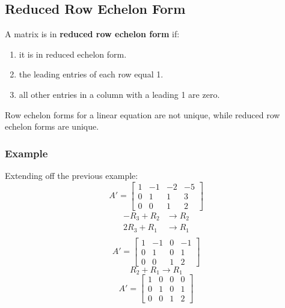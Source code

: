 \documentclass{math}
\begin{document}
\subsection*{Reduced Row Echelon Form}
A matrix is in \textbf{reduced row echelon form} if:
\begin{enumerate}
  \item it is in reduced echelon form.
  \item the leading entries of each row equal 1.
  \item all other entries in a column with a leading 1 are zero.
\end{enumerate}
Row echelon forms for a linear equation are not unique, while reduced row
echelon forms are unique.

\subsubsection*{Example}
Extending off the previous example:
\[ A' = \left[\begin{array}{ccc|c}
  1 & -1 & -2 & -5 \\
  0 & 1 & 1 & 3 \\
  0 & 0 & 1 & 2
\end{array}\right] \]
\begin{align*}
  -R_3+R_2 &\to R_2 \\
  2R_3+R_1 &\to R_1 \\
\end{align*}
\[ A' = \left[\begin{array}{ccc|c}
  1 & -1 & 0 & -1 \\
  0 & 1 & 0 & 1 \\
  0 & 0 & 1 & 2
\end{array}\right] \]
\[ R_2+R_1 \to R_1 \]
\[ A' = \left[\begin{array}{ccc|c}
  1 & 0 & 0 & 0 \\
  0 & 1 & 0 & 1 \\
  0 & 0 & 1 & 2
\end{array}\right] \]
\end{document}
